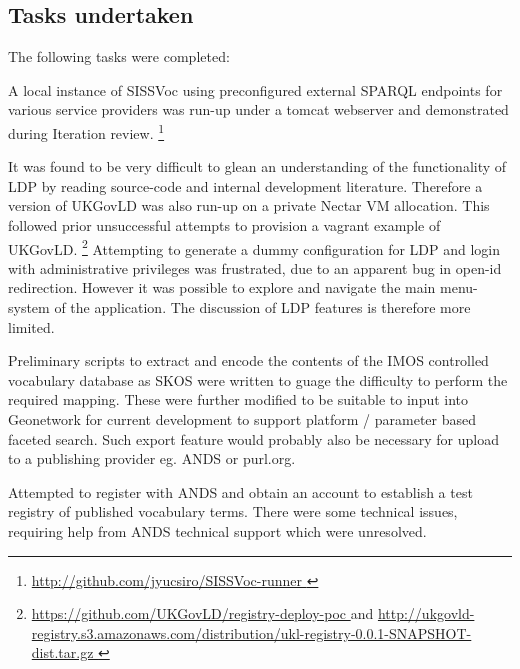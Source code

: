 \documentclass[10pt,a4paper]{article}
\begin{document}
\begin{flushleft}
\clearpage



\section{
  Tasks undertaken
}

%  
  The following tasks were completed:  

    \item[] A local instance of SISSVoc using preconfigured external SPARQL
  endpoints for various service providers was run-up under a tomcat webserver and
  demonstrated during Iteration review.  \footnote{ \url {
  http://github.com/jyucsiro/SISSVoc-runner }  } 

    \item[] It was found to be very difficult to glean an understanding of the
  functionality of LDP by reading source-code and internal development
  literature. Therefore a version of UKGovLD was also run-up on a private Nectar
  VM allocation. This followed prior unsuccessful attempts to provision a vagrant
  example of UKGovLD.  \footnote{ \url {
  https://github.com/UKGovLD/registry-deploy-poc } and \url {
  http://ukgovld-registry.s3.amazonaws.com/distribution/ukl-registry-0.0.1-SNAPSHOT-dist.tar.gz
  } }
    Attempting to generate a dummy configuration for LDP and login with
  administrative privileges was frustrated, due to an apparent bug in open-id redirection.
  However it was possible to explore and navigate the main menu-system of the
  application.
    The discussion of LDP features is therefore more limited.

    \item[] Preliminary scripts to extract and encode the contents of the IMOS
  controlled vocabulary database as SKOS were written to guage the difficulty to
  perform the required mapping. These were further modified to be suitable to
  input into Geonetwork for current development to support platform / parameter
  based faceted search. Such export feature would probably also be necessary for
  upload to a publishing provider eg. ANDS or purl.org. 

    \item[] Attempted to register with ANDS and obtain an account to establish a
  test registry of published vocabulary terms. There were some technical issues,
  requiring help from ANDS technical support which were unresolved.
      

\end{flushleft}
\end{document}
